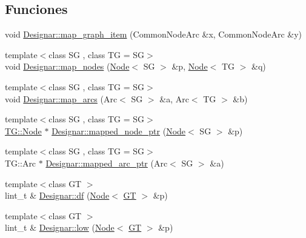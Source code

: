 \subsection*{Funciones}
\begin{DoxyCompactItemize}
\item 
void \hyperlink{namespace_designar_a9f88b21c36d5175a156085da54ae0142}{Designar\+::map\+\_\+graph\+\_\+item} (Common\+Node\+Arc \&x, Common\+Node\+Arc \&y)
\item 
{\footnotesize template$<$class SG , class TG  = SG$>$ }\\void \hyperlink{namespace_designar_ac25cc2c91956f9d642d666212c11a7b4}{Designar\+::map\+\_\+nodes} (\hyperlink{test-mtreenode_8_c_a17a24b0725f59987143c5faf63c4dc6f}{Node}$<$ SG $>$ \&p, \hyperlink{test-mtreenode_8_c_a17a24b0725f59987143c5faf63c4dc6f}{Node}$<$ TG $>$ \&q)
\item 
{\footnotesize template$<$class SG , class TG  = SG$>$ }\\void \hyperlink{namespace_designar_a43f3e67569ab19b34f6e6a1073cab200}{Designar\+::map\+\_\+arcs} (Arc$<$ SG $>$ \&a, Arc$<$ TG $>$ \&b)
\item 
{\footnotesize template$<$class SG , class TG  = SG$>$ }\\\hyperlink{test-mtreenode_8_c_a17a24b0725f59987143c5faf63c4dc6f}{T\+G\+::\+Node} $\ast$ \hyperlink{namespace_designar_aff258240f7d203d3ea3beb526faed976}{Designar\+::mapped\+\_\+node\+\_\+ptr} (\hyperlink{test-mtreenode_8_c_a17a24b0725f59987143c5faf63c4dc6f}{Node}$<$ SG $>$ \&p)
\item 
{\footnotesize template$<$class SG , class TG  = SG$>$ }\\T\+G\+::\+Arc $\ast$ \hyperlink{namespace_designar_aebe025edea41b779d1c918b8d6e05ff5}{Designar\+::mapped\+\_\+arc\+\_\+ptr} (Arc$<$ SG $>$ \&a)
\item 
{\footnotesize template$<$class GT $>$ }\\lint\+\_\+t \& \hyperlink{namespace_designar_aacbba165f7a2d6b320e94303dc54aa2b}{Designar\+::df} (\hyperlink{test-mtreenode_8_c_a17a24b0725f59987143c5faf63c4dc6f}{Node}$<$ \hyperlink{demo-buildgraph_8_c_a3001c40d2c31ca87ed96cd7d1334a55e}{GT} $>$ \&p)
\item 
{\footnotesize template$<$class GT $>$ }\\lint\+\_\+t \& \hyperlink{namespace_designar_accdbfaff311d99b93c324947ce57dbda}{Designar\+::low} (\hyperlink{test-mtreenode_8_c_a17a24b0725f59987143c5faf63c4dc6f}{Node}$<$ \hyperlink{demo-buildgraph_8_c_a3001c40d2c31ca87ed96cd7d1334a55e}{GT} $>$ \&p)

\end{DoxyCompactItemize}
